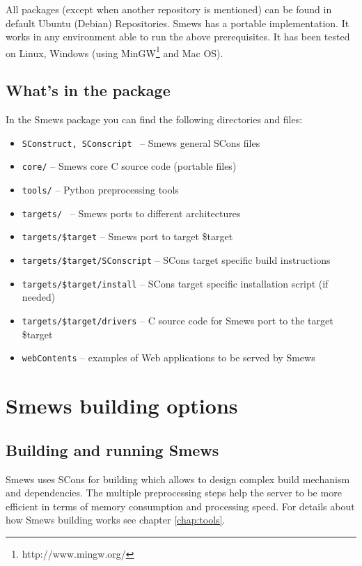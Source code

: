 \documentclass{report}
\begin{document}
All packages (except when another repository is mentioned) can be found in default Ubuntu (Debian) Repositories.
Smews has a portable implementation. It works in any environment able to run the above prerequisites. It has been tested on Linux, Windows (using MinGW\footnote{http://www.mingw.org/} and Mac OS).

\subsection{What's in the package}

In the Smews package you can find the following directories and files: 

\begin{itemize}
\item \texttt{SConstruct, SConscript }                -- Smews general SCons files
\item \texttt{core/}                                -- Smews core C source code (portable files)
\item \texttt{tools/}                                 -- Python preprocessing tools
\item \texttt{targets/ }                              -- Smews ports to different architectures
\item \texttt{targets/\$target}                       -- Smews port to target \$target
\item \texttt{targets/\$target/SConscript}            -- SCons target specific build instructions
\item \texttt{targets/\$target/install}               -- SCons target specific installation script (if needed)
\item \texttt{targets/\$target/drivers}               -- C source code for Smews port to the target \$target 
\item \texttt{webContents}                            -- examples of Web applications to be served by Smews
\end{itemize}

\section{Smews building options}

\subsection{Building and running Smews}

Smews uses SCons for building which allows to design complex build mechanism and dependencies. The multiple preprocessing steps help the server to be more efficient in terms of memory consumption and processing speed. For details about how Smews building works see chapter \ref{chap:tools}.
\end{document}
